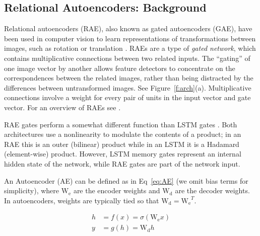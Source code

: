 \documentclass[11pt]{article}
\begin{document}
\subsection{Relational Autoencoders: Background}

Relational autoencoders (RAE), also known as gated autoencoders (GAE),
have been used in computer vision to learn representations of
transformations between images, such as rotation or translation \citep{memisevic:07,memisevic:12,memisevic:13}. RAEs
are a type of {\it gated network}, which contains multiplicative connections
between two related inputs.
The ``gating'' of one image vector by another allows feature detectors to concentrate on the correspondences between the related images, rather than being distracted by the differences between untransformed images. See Figure~\ref{f:arch}(a). 
Multiplicative connections involve
a weight for every pair of units in the input vector and gate vector. For an overview of RAEs see \citet{memisevic:13,sigaud:15}.

RAE gates perform a somewhat different function than LSTM gates \citep{lstm}. Both architectures use a nonlinearity to modulate the contents of a product; in an RAE this is an outer (bilinear) product while in an LSTM it is a Hadamard (element-wise) product. However, LSTM memory gates represent an internal hidden state of the network, while RAE gates are part of the network input.

An Autoencoder (AE) can be defined as in Eq~\ref{eq:AE} (we omit bias terms for simplicity), where $\mathrm{W_e}$ are the encoder weights and $\mathrm{W_d}$ are the decoder weights. In autoencoders, weights are typically tied so that $\mathrm{W_d} = \mathrm{W_e}^T$.

\vspace{-7mm}
\begin{equation}
\begin{split}
h & = f(x) = \sigma (\mathrm{W_e}x ) \\
y & = g(h) = \mathrm{W_d}h
\end{split}
\label{eq:AE}
\end{equation}
\vspace{-5mm}
\end{document}
